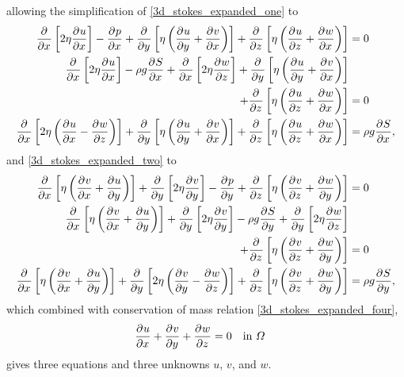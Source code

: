 allowing the simplification of \cref{3d_stokes_expanded_one} to
{\tiny
\begin{align}
  \parder{}{x} \left[2\eta \parder{u}{x} \right]  - \parder{p}{x} + \parder{}{y} \left[\eta \left( \parder{u}{y} + \parder{v}{x} \right) \right] + \parder{}{z} \left[\eta \left( \parder{u}{z} + \parder{w}{x} \right) \right] &= 0 \notag \\ 
  \parder{}{x} \left[2\eta \parder{u}{x} \right]  - \rho g\parder{S}{x} + \parder{}{x} \left[ 2\eta \parder{w}{z} \right] + \parder{}{y} \left[\eta \left( \parder{u}{y} + \parder{v}{x} \right) \right] & \notag \\
  + \parder{}{z} \left[\eta \left( \parder{u}{z} + \parder{w}{x} \right) \right] &= 0 \notag \\ 
  \label{first_stokes_exp_stress_simp}
  \parder{}{x} \left[2\eta \left( \parder{u}{x} - \parder{w}{z} \right) \right]  + \parder{}{y} \left[\eta \left( \parder{u}{y} + \parder{v}{x} \right) \right] + \parder{}{z} \left[\eta \left( \parder{u}{z} + \parder{w}{x} \right) \right] &= \rho g\parder{S}{x},
\end{align}}
and \cref{3d_stokes_expanded_two} to
{\tiny
\begin{align}
  \parder{}{x} \left[\eta \left( \parder{v}{x} + \parder{u}{y} \right) \right]  + \parder{}{y} \left[2\eta \parder{v}{y} \right] - \parder{p}{y} + \parder{}{z} \left[\eta \left( \parder{v}{z} + \parder{w}{y} \right) \right] &= 0 \notag \\ 
  \parder{}{x} \left[\eta \left( \parder{v}{x} + \parder{u}{y} \right) \right]  + \parder{}{y} \left[2\eta \parder{v}{y} \right] - \rho g\parder{S}{y} + \parder{}{y} \left[ 2\eta \parder{w}{z} \right] &\notag \\
  + \parder{}{z} \left[\eta \left( \parder{v}{z} + \parder{w}{y} \right) \right] &= 0 \notag \\ 
  \label{second_stokes_exp_stress_simp}
  \parder{}{x} \left[\eta \left( \parder{v}{x} + \parder{u}{y} \right) \right]  + \parder{}{y} \left[2\eta \left( \parder{v}{y} - \parder{w}{z} \right) \right] + \parder{}{z} \left[\eta \left( \parder{v}{z} + \parder{w}{y} \right) \right] &= \rho g \parder{S}{y},
\end{align}}
which combined with conservation of mass relation \cref{3d_stokes_expanded_four},
\begin{align*}
  \frac{\partial{^{}} u}{\partial x{^{}} } + \frac{\partial{^{}} v}{\partial y{^{}} } + \frac{\partial{^{}} w}{\partial z{^{}} } &= 0 && \text{in } \varOmega 
\end{align*}
gives three equations and three unknowns $u$, $v$, and $w$.

